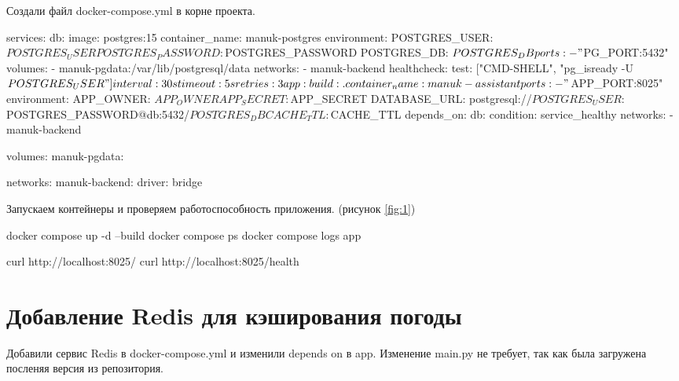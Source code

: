 Создали файл docker-compose.yml в корне проекта. 

\begin{code}
services:
  db:
    image: postgres:15
    container_name: manuk-postgres
    environment:
      POSTGRES_USER: ${POSTGRES_USER}
      POSTGRES_PASSWORD: ${POSTGRES_PASSWORD}
      POSTGRES_DB: ${POSTGRES_DB}
    ports:
      - "${PG_PORT}:5432"
    volumes:
      - manuk-pgdata:/var/lib/postgresql/data
    networks:
      - manuk-backend
    healthcheck:
      test: ["CMD-SHELL", "pg_isready -U ${POSTGRES_USER}"]
      interval: 30s
      timeout: 5s
      retries: 3

  app:
    build: .
    container_name: manuk-assistant
    ports:
      - "${APP_PORT}:8025"  
    environment:
      APP_OWNER: ${APP_OWNER}
      APP_SECRET: ${APP_SECRET}
      DATABASE_URL: postgresql://${POSTGRES_USER}:${POSTGRES_PASSWORD}@db:5432/${POSTGRES_DB}
      CACHE_TTL: ${CACHE_TTL}
    depends_on:
      db:
        condition: service_healthy
    networks:
      - manuk-backend

volumes:
  manuk-pgdata:

networks:
  manuk-backend:
    driver: bridge
\end{code}

Запускаем контейнеры и проверяем работоспособность приложения. (рисунок \ref{fig:1})

\begin{code}
docker compose up -d --build
docker compose ps
docker compose logs app

curl http://localhost:8025/
curl http://localhost:8025/health
\end{code}


\section{Добавление Redis для кэширования погоды}

Добавили сервис Redis в docker-compose.yml и изменили depends on в app. Изменение main.py не требует, так как была загружена посленяя версия из репозитория.


